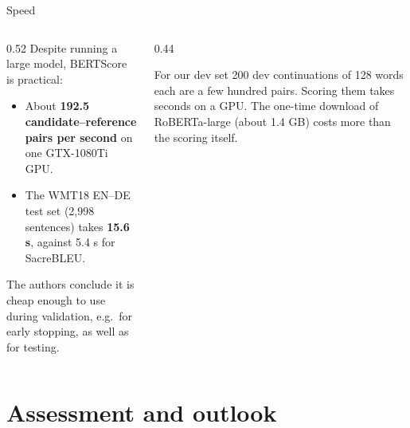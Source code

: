\documentclass[aspectratio=169,11pt]{beamer}
\begin{document}
\begin{frame}{Speed}
  \begin{columns}[T]
    \begin{column}{0.52\textwidth}
      \small
      Despite running a large model, BERTScore is practical:
      \begin{itemize}
        \item About \textbf{192.5 candidate--reference pairs per second} on one GTX-1080Ti GPU.
        \item The WMT18 EN--DE test set (2,998 sentences) takes \textbf{15.6 s}, against 5.4 s for SacreBLEU.
      \end{itemize}
      The authors conclude it is cheap enough to use during validation, e.g.\ for early stopping, as well as for testing.
    \end{column}
    \begin{column}{0.44\textwidth}
      \begin{exampleblock}{For our dev set}
        \small
        200 dev continuations of 128 words each are a few hundred pairs.
        Scoring them takes seconds on a GPU. The one-time download of RoBERTa-large (about 1.4 GB) costs more than the scoring itself.
      \end{exampleblock}
    \end{column}
  \end{columns}
\end{frame}

\section{Assessment and outlook}
\end{document}
